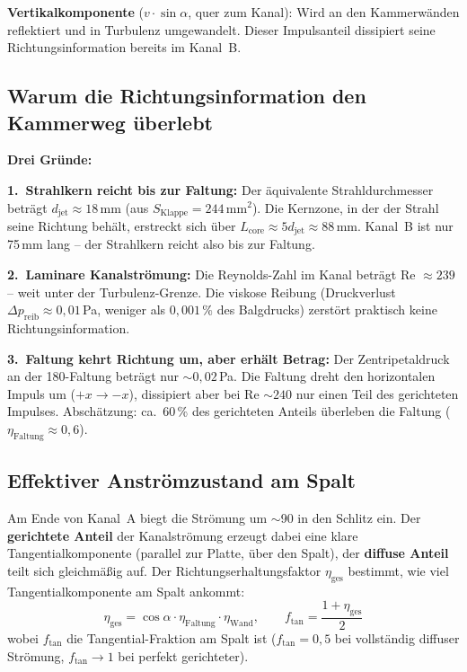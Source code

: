 \documentclass[11pt,a4paper]{article}
\begin{document}
\textbf{Vertikalkomponente} ($v \cdot \sin\alpha$, quer zum Kanal): Wird an den Kammerwänden reflektiert und in Turbulenz umgewandelt. Dieser Impulsanteil dissipiert seine Richtungsinformation bereits im Kanal~B.

\subsection{Warum die Richtungsinformation den Kammerweg überlebt}

\textbf{Drei Gründe:}

\textbf{1.\ Strahlkern reicht bis zur Faltung:} Der äquivalente Strahldurchmesser beträgt $d_\text{jet} \approx 18$\,mm (aus $S_\text{Klappe} = 244$\,mm$^2$). Die Kernzone, in der der Strahl seine Richtung behält, erstreckt sich über $L_\text{core} \approx 5 d_\text{jet} \approx 88$\,mm. Kanal~B ist nur 75\,mm lang -- der Strahlkern reicht also bis zur Faltung.

\textbf{2.\ Laminare Kanalströmung:} Die Reynolds-Zahl im Kanal beträgt Re $\approx 239$ -- weit unter der Turbulenz-Grenze. Die viskose Reibung (Druckverlust $\Delta p_\text{reib} \approx 0{,}01$\,Pa, weniger als $0{,}001\,\%$ des Balgdrucks) zerstört praktisch keine Richtungsinformation.

\textbf{3.\ Faltung kehrt Richtung um, aber erhält Betrag:} Der Zentripetaldruck an der 180\textdegree-Faltung beträgt nur $\sim 0{,}02$\,Pa. Die Faltung dreht den horizontalen Impuls um ($+x \rightarrow -x$), dissipiert aber bei Re $\sim 240$ nur einen Teil des gerichteten Impulses. Abschätzung: ca.\ 60\,\% des gerichteten Anteils überleben die Faltung ($\eta_\text{Faltung} \approx 0{,}6$).

\subsection{Effektiver Anströmzustand am Spalt}

Am Ende von Kanal~A biegt die Strömung um $\sim$90\textdegree{} in den Schlitz ein. Der \textbf{gerichtete Anteil} der Kanalströmung erzeugt dabei eine klare Tangentialkomponente (parallel zur Platte, über den Spalt), der \textbf{diffuse Anteil} teilt sich gleichmäßig auf. Der Richtungserhaltungsfaktor $\eta_\text{ges}$ bestimmt, wie viel Tangentialkomponente am Spalt ankommt:
\begin{equation}
\eta_\text{ges} = \cos\alpha \cdot \eta_\text{Faltung} \cdot \eta_\text{Wand}, \qquad
f_\text{tan} = \frac{1 + \eta_\text{ges}}{2}
\end{equation}
wobei $f_\text{tan}$ die Tangential-Fraktion am Spalt ist ($f_\text{tan} = 0{,}5$ bei vollständig diffuser Strömung, $f_\text{tan} \to 1$ bei perfekt gerichteter).
\end{document}
